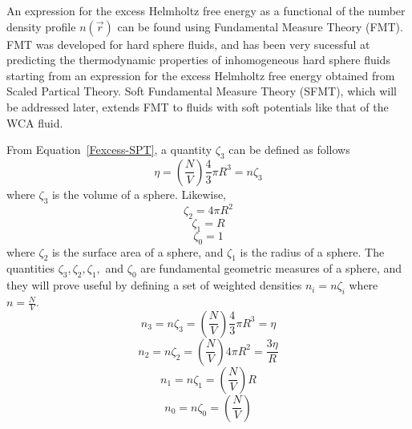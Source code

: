 \documentclass[double,12pt]{beavtex}
\begin{document}
An expression for the excess Helmholtz free energy as a functional of the number density profile $n(\vec r)$ can be found using Fundamental Measure Theory (FMT).
FMT was developed for hard sphere fluids, and has been very sucessful at predicting the thermodynamic properties of inhomogeneous hard sphere fluids starting from an expression for the excess Helmholtz free energy obtained from Scaled Partical Theory. 
Soft Fundamental Measure Theory (SFMT), which will be addressed later, extends FMT to fluids with soft potentials like that of the WCA fluid.

From Equation~\ref{Fexcess-SPT}, a quantity $\zeta_{3}$ can be defined as follows
\begin{equation}{\eta =\left(\frac{N}{V}\right)\frac{4}{3}\pi{R^3}=n\zeta_{3}}\end{equation}
where $\zeta_{3}$ is the volume of a sphere. Likewise,
\begin{equation}{\zeta_{2}=4\pi{R^2}}\end{equation}
\begin{equation}{\zeta_{1}=R}\end{equation}
\begin{equation}{\zeta_{0}=1}\end{equation}
where $\zeta_{2}$ is the surface area of a sphere, and $\zeta_{1}$ is the radius of a sphere. The quantities $\zeta_{3}, \zeta_{2}, \zeta_{1},$ and $\zeta_{0}$ are fundamental geometric measures of a sphere, and they will prove useful by defining a set of weighted densities $n_{i}=n\zeta_{i}$ where $n=\frac{N}{V}$. 
\begin{equation}\label{n3}{n_{3}=n\zeta_{3}=\left(\frac{N}{V}\right)\frac{4}{3}\pi{R^3}=\eta}\end{equation}
\begin{equation}\label{n2}{n_{2}=n\zeta_{2}=\left(\frac{N}{V}\right)4\pi{R^2}=\frac{3\eta}{R}}\end{equation}
\begin{equation}\label{n1}{n_{1}=n\zeta_{1}=\left(\frac{N}{V}\right)R}\end{equation}
\begin{equation}\label{n0}{n_{0}=n\zeta_{0}=\left(\frac{N}{V}\right)}\end{equation}
\end{document}
